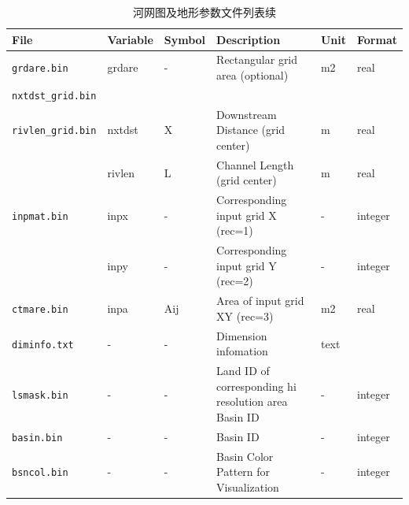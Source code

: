 \begin{table}[]
\centering
\caption{河网图及地形参数文件列表续}
\label{tab:河网图及地形参数文件列表2}
    \begin{tabular}[h]{p{2.5cm}p{1.5cm}p{2.5cm}p{4cm}p{2cm}p{1cm}} %
    \toprule
    File             & Variable & Symbol                             & Description                                          & Unit     & Format  \\ \midrule
    \texttt{grdare.bin}       & grdare   & -                                  & Rectangular grid area (optional)                     & m2       & real    \\
    \texttt{nxtdst\_grid.bin} &          &                                    &                                                      &          &         \\
    \texttt{rivlen\_grid.bin} & nxtdst   & X                                  & Downstream Distance (grid center)                    & m        & real    \\
                                        & rivlen    & L                            & Channel Length (grid center)       &    m                             & real        \\
    \texttt{inpmat.bin}       & inpx     & -                                  & Corresponding input grid X (rec=1) & -        & integer \\
                                       & inpy     & -                               & Corresponding input grid Y (rec=2)    & -        & integer  \\
    \texttt{ctmare.bin}       & inpa     & Aij                            & Area of input grid XY (rec=3)              & m2     & real    \\
    \texttt{diminfo.txt}      & -        & -                                  & Dimension infomation                         & text     &         \\
    \texttt{lsmask.bin}       & -        & -                                  & Land ID of corresponding hi resolution area Basin ID & -        & integer \\
    \texttt{basin.bin}        & -        & -                                  & Basin ID                                             & -        & integer \\
    \texttt{bsncol.bin}       & -        & -                                  & Basin Color Pattern for Visualization                & -        & integer \\

\end{tabular}
\end{table}
